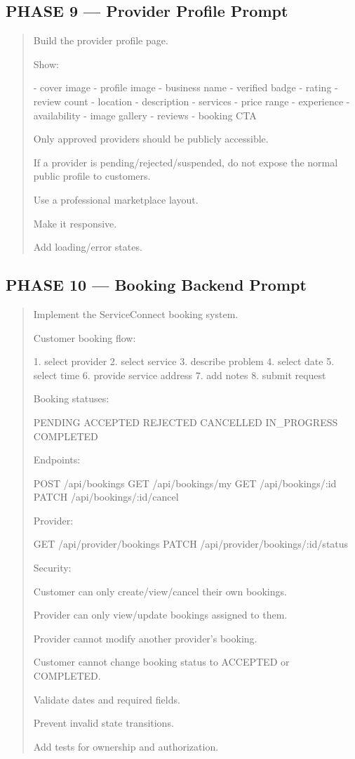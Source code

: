 \subsection*{PHASE 9 --- Provider Profile Prompt}

\begin{quote}
Build the provider profile page.

Show:

- cover image
- profile image
- business name
- verified badge
- rating
- review count
- location
- description
- services
- price range
- experience
- availability
- image gallery
- reviews
- booking CTA

Only approved providers should be publicly accessible.

If a provider is pending/rejected/suspended, do not expose the normal
public profile to customers.

Use a professional marketplace layout.

Make it responsive.

Add loading/error states.
\end{quote}

\subsection*{PHASE 10 --- Booking Backend Prompt}

\begin{quote}
Implement the ServiceConnect booking system.

Customer booking flow:

1. select provider
2. select service
3. describe problem
4. select date
5. select time
6. provide service address
7. add notes
8. submit request

Booking statuses:

PENDING
ACCEPTED
REJECTED
CANCELLED
IN_PROGRESS
COMPLETED

Endpoints:

POST /api/bookings
GET /api/bookings/my
GET /api/bookings/:id
PATCH /api/bookings/:id/cancel

Provider:

GET /api/provider/bookings
PATCH /api/provider/bookings/:id/status

Security:

Customer can only create/view/cancel their own bookings.

Provider can only view/update bookings assigned to them.

Provider cannot modify another provider's booking.

Customer cannot change booking status to ACCEPTED or COMPLETED.

Validate dates and required fields.

Prevent invalid state transitions.

Add tests for ownership and authorization.
\end{quote}

